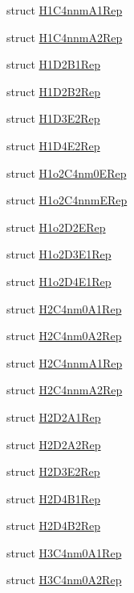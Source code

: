 \begin{DoxyCompactItemize}
struct \mbox{\hyperlink{structHadron_1_1H1C4nnmA1Rep}{H1\+C4nnm\+A1\+Rep}}
\item 
struct \mbox{\hyperlink{structHadron_1_1H1C4nnmA2Rep}{H1\+C4nnm\+A2\+Rep}}
\item 
struct \mbox{\hyperlink{structHadron_1_1H1D2B1Rep}{H1\+D2\+B1\+Rep}}
\item 
struct \mbox{\hyperlink{structHadron_1_1H1D2B2Rep}{H1\+D2\+B2\+Rep}}
\item 
struct \mbox{\hyperlink{structHadron_1_1H1D3E2Rep}{H1\+D3\+E2\+Rep}}
\item 
struct \mbox{\hyperlink{structHadron_1_1H1D4E2Rep}{H1\+D4\+E2\+Rep}}
\item 
struct \mbox{\hyperlink{structHadron_1_1H1o2C4nm0ERep}{H1o2\+C4nm0\+E\+Rep}}
\item 
struct \mbox{\hyperlink{structHadron_1_1H1o2C4nnmERep}{H1o2\+C4nnm\+E\+Rep}}
\item 
struct \mbox{\hyperlink{structHadron_1_1H1o2D2ERep}{H1o2\+D2\+E\+Rep}}
\item 
struct \mbox{\hyperlink{structHadron_1_1H1o2D3E1Rep}{H1o2\+D3\+E1\+Rep}}
\item 
struct \mbox{\hyperlink{structHadron_1_1H1o2D4E1Rep}{H1o2\+D4\+E1\+Rep}}
\item 
struct \mbox{\hyperlink{structHadron_1_1H2C4nm0A1Rep}{H2\+C4nm0\+A1\+Rep}}
\item 
struct \mbox{\hyperlink{structHadron_1_1H2C4nm0A2Rep}{H2\+C4nm0\+A2\+Rep}}
\item 
struct \mbox{\hyperlink{structHadron_1_1H2C4nnmA1Rep}{H2\+C4nnm\+A1\+Rep}}
\item 
struct \mbox{\hyperlink{structHadron_1_1H2C4nnmA2Rep}{H2\+C4nnm\+A2\+Rep}}
\item 
struct \mbox{\hyperlink{structHadron_1_1H2D2A1Rep}{H2\+D2\+A1\+Rep}}
\item 
struct \mbox{\hyperlink{structHadron_1_1H2D2A2Rep}{H2\+D2\+A2\+Rep}}
\item 
struct \mbox{\hyperlink{structHadron_1_1H2D3E2Rep}{H2\+D3\+E2\+Rep}}
\item 
struct \mbox{\hyperlink{structHadron_1_1H2D4B1Rep}{H2\+D4\+B1\+Rep}}
\item 
struct \mbox{\hyperlink{structHadron_1_1H2D4B2Rep}{H2\+D4\+B2\+Rep}}
\item 
struct \mbox{\hyperlink{structHadron_1_1H3C4nm0A1Rep}{H3\+C4nm0\+A1\+Rep}}
\item 
struct \mbox{\hyperlink{structHadron_1_1H3C4nm0A2Rep}{H3\+C4nm0\+A2\+Rep}}
\item 

\end{DoxyCompactItemize}
